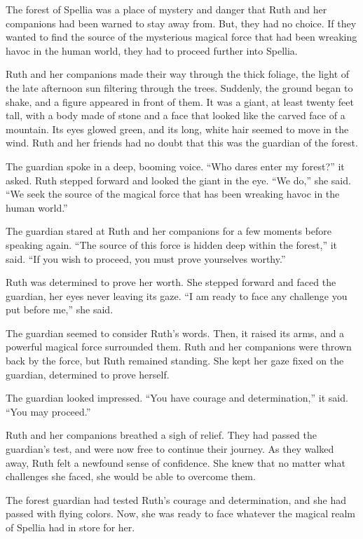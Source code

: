 
The forest of Spellia was a place of mystery and danger that Ruth and her companions had been warned to stay away from. But, they had no choice. If they wanted to find the source of the mysterious magical force that had been wreaking havoc in the human world, they had to proceed further into Spellia. 

Ruth and her companions made their way through the thick foliage, the light of the late afternoon sun filtering through the trees. Suddenly, the ground began to shake, and a figure appeared in front of them. It was a giant, at least twenty feet tall, with a body made of stone and a face that looked like the carved face of a mountain. Its eyes glowed green, and its long, white hair seemed to move in the wind. Ruth and her friends had no doubt that this was the guardian of the forest. 

The guardian spoke in a deep, booming voice. “Who dares enter my forest?” it asked. Ruth stepped forward and looked the giant in the eye. “We do,” she said. “We seek the source of the magical force that has been wreaking havoc in the human world.” 

The guardian stared at Ruth and her companions for a few moments before speaking again. “The source of this force is hidden deep within the forest,” it said. “If you wish to proceed, you must prove yourselves worthy.”

Ruth was determined to prove her worth. She stepped forward and faced the guardian, her eyes never leaving its gaze. “I am ready to face any challenge you put before me,” she said. 

The guardian seemed to consider Ruth’s words. Then, it raised its arms, and a powerful magical force surrounded them. Ruth and her companions were thrown back by the force, but Ruth remained standing. She kept her gaze fixed on the guardian, determined to prove herself. 

The guardian looked impressed. “You have courage and determination,” it said. “You may proceed.”

Ruth and her companions breathed a sigh of relief. They had passed the guardian’s test, and were now free to continue their journey. As they walked away, Ruth felt a newfound sense of confidence. She knew that no matter what challenges she faced, she would be able to overcome them. 

The forest guardian had tested Ruth’s courage and determination, and she had passed with flying colors. Now, she was ready to face whatever the magical realm of Spellia had in store for her.